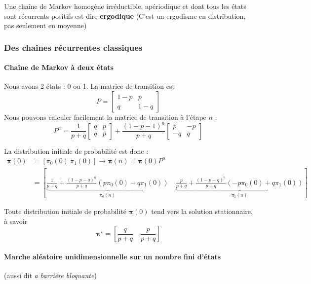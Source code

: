 \documentclass[11pt,a4paper]{article}
\numberwithin{equation}{section}
\begin{document}

Une chaîne de Markov homogène irréductible, apériodique et dont tous les états sont récurrents positifs est dire \textbf{ergodique} (C'est un ergodisme en distribution, pas seulement en moyenne)


\subsubsection{Des chaînes récurrentes classiques}
\paragraph{Chaîne de Markov à deux états}
Nous avons 2 états : 0 ou 1. La matrice de transition est
\begin{equation}
    P = \begin{bmatrix}
    1-p & p\\
    q & 1-q
\end{bmatrix}
\end{equation}
Nous pouvons calculer facilement la matrice de transition à l'étape $n$ :
\begin{equation}
    P^n = \frac{1}{p+q}\begin{bmatrix}
        q & p\\
        q & p    
\end{bmatrix} + \frac{(1-p-1)^n}{p+q} \begin{bmatrix}
    p & -p\\
    -q & q
\end{bmatrix}
\end{equation}

La distribution initiale de probabilité est donc :
\[\begin{array}{ll}
    \boldsymbol{\pi}(0) &= [\pi_0(0)\ \pi_1(0)] \to \boldsymbol{\pi}(n) = \boldsymbol{\pi}(0)P^n 
    \\ 
    &= \left[\underbrace{\frac{1}{p+q} + \frac{(1-p-q)^n}{p+q}(p\pi_0(0) - q\pi_1(0))}_{\pi_0(n)}\quad \underbrace{\frac{p}{p+q} + \frac{(1-p-q)^n}{p+q}(-p\pi_0(0) + q \pi_1(0))}_{\pi_1(n)} \right]
\end{array}\]

Toute distribution initiale de probabilité $\boldsymbol{\pi}(0)$ tend vers la solution stationnaire, à savoir 
\begin{equation}
    \boldsymbol{\pi}^\star = \left[\frac{q}{p+q}\quad \frac{p}{p+q}\right]
\end{equation}

\paragraph{Marche aléatoire unidimensionnelle sur un nombre fini d'états}
(aussi dit \textit{a barrière bloquante})
\end{document}
